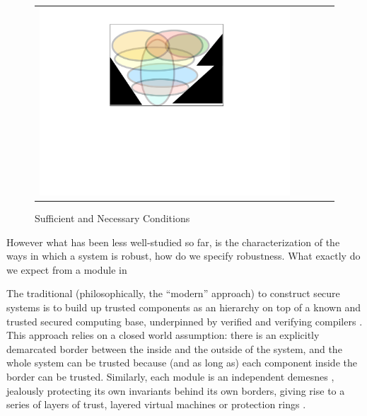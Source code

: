 \begin{figure}[htb]
\begin{tabular}{clclc}
\begin{minipage}{0.30\textwidth}
 \includegraphics[width=\linewidth, trim=250  320 320 90,clip]{diagrams/NecAndSuff.pdf}
\end{minipage}
 \end{tabular}
 \label{fig:NecessaryAndSuff}
  \caption{Sufficient and Necessary Conditions}
 \end{figure}


However what has been less well-studied
so far, is the characterization of the ways in which a system is robust, \ie how do we
specify robustness. What exactly do we expect from a module in 

 
The traditional (philosophically, the ``modern'' approach) to
construct secure systems is to build up trusted components as an
hierarchy on top of a known and trusted secured computing base,
underpinned by verified and verifying compilers \cite{HoareManifesto}.
This approach relies on a closed world assumption: there is an
explicitly demarcated border between the inside and the outside of the
system, and the whole system can be trusted because (and as long as)
each component inside the border can be trusted. Similarly, each
module is an independent demesnes \cite{wills}, jealously
protecting its own invariants behind its own borders, giving rise to a
series of layers of trust, layered virtual machines
\cite{nosp} or protection rings \cite{pola}.

